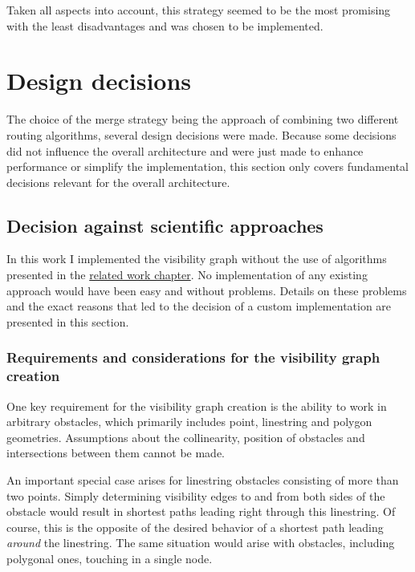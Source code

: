 		Taken all aspects into account, this strategy seemed to be the most promising with the least disadvantages and was chosen to be implemented.

\section{Design decisions}
\label{sec:design-decisions}

	The choice of the merge strategy being the approach of combining two different routing algorithms, several design decisions were made.
	Because some decisions did not influence the overall architecture and were just made to enhance performance or simplify the implementation, this section only covers fundamental decisions relevant for the overall architecture.
	
	\subsection{Decision against scientific approaches}
	
		In this work I implemented the visibility graph without the use of algorithms presented in the \hyperref[chap:related-work]{related work chapter}.
		No implementation of any existing approach would have been easy and without problems.
		Details on these problems and the exact reasons that led to the decision of a custom implementation are presented in this section.
		
		\subsubsection{Requirements and considerations for the visibility graph creation}
		
			One key requirement for the visibility graph creation is the ability to work in arbitrary obstacles, which primarily includes point, linestring and polygon geometries.
			Assumptions about the collinearity, position of obstacles and intersections between them cannot be made.
			
			An important special case arises for linestring obstacles consisting of more than two points.
			Simply determining visibility edges to and from both sides of the obstacle would result in shortest paths leading right through this linestring.
			Of course, this is the opposite of the desired behavior of a shortest path leading \emph{around} the linestring.
			The same situation would arise with obstacles, including polygonal ones, touching in a single node.
			
